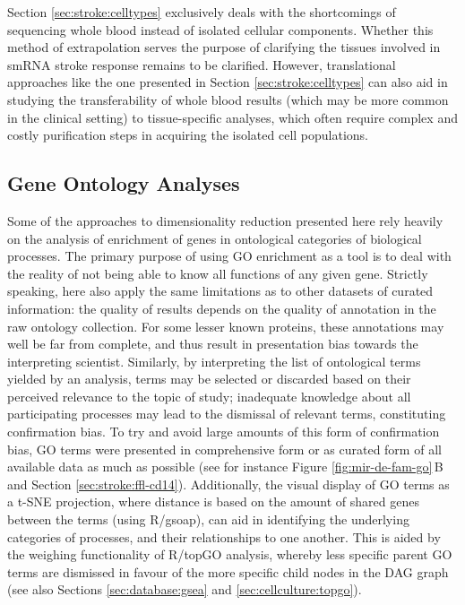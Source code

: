 Section \ref{sec:stroke:celltypes} exclusively deals with the shortcomings of sequencing whole blood instead of isolated cellular components. Whether this method of extrapolation serves the purpose of clarifying the tissues involved in smRNA stroke response remains to be clarified. However, translational approaches like the one presented in Section \ref{sec:stroke:celltypes} can also aid in studying the transferability of whole blood results (which may be more common in the clinical setting) to tissue-specific analyses, which often require complex and costly purification steps in acquiring the isolated cell populations.

\subsection{Gene Ontology Analyses} \label{sec:discussion:go}
Some of the approaches to dimensionality reduction presented here rely heavily on the analysis of enrichment of genes in ontological categories of biological processes. The primary purpose of using GO enrichment as a tool is to deal with the reality of not being able to know all functions of any given gene. Strictly speaking, here also apply the same limitations as to other datasets of curated information: the quality of results depends on the quality of annotation in the raw ontology collection. For some lesser known proteins, these annotations may well be far from complete, and thus result in presentation bias towards the interpreting scientist. Similarly, by interpreting the list of ontological terms yielded by an analysis, terms may be selected or discarded based on their perceived relevance to the topic of study; inadequate knowledge about all participating processes may lead to the dismissal of relevant terms, constituting confirmation bias. To try and avoid large amounts of this form of confirmation bias, GO terms were presented in comprehensive form or as curated form of all available data as much as possible (see for instance Figure \ref{fig:mir-de-fam-go}\,B and Section \ref{sec:stroke:ffl-cd14}). Additionally, the visual display of GO terms as a t-SNE projection, where distance is based on the amount of shared genes between the terms (using R/gsoap\cite{Tokar2020}), can aid in identifying the underlying categories of processes, and their relationships to one another. This is aided by the weighing functionality of R/topGO analysis,\cite{Alexa2006} whereby less specific parent GO terms are dismissed in favour of the more specific child nodes in the DAG graph (see also Sections \ref{sec:database:gsea} and \ref{sec:cellculture:topgo}).

